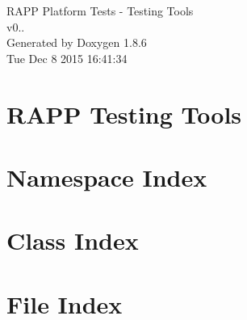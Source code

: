 \documentclass[twoside]{book}
\newcommand{\clearemptydoublepage}{%
  \newpage{\pagestyle{empty}\cleardoublepage}%
}
\begin{document}
\hypersetup{pageanchor=false}
\begin{titlepage}
\vspace*{7cm}
\begin{center}%
{\Large R\-A\-P\-P Platform Tests -\/ Testing Tools \\[1ex]\large v0.. }\\
\vspace*{1cm}
{\large Generated by Doxygen 1.8.6}\\
\vspace*{0.5cm}
{\small Tue Dec 8 2015 16:41:34}\\
\end{center}
\end{titlepage}
\clearemptydoublepage
\tableofcontents
\clearemptydoublepage
{}
\hypersetup{pageanchor=true}

\chapter{R\-A\-P\-P Testing Tools}
\label{md__home_travis_rapp_temp_rapp-platform_rapp_testing_tools_README}
\hypertarget{md__home_travis_rapp_temp_rapp-platform_rapp_testing_tools_README}{}

\chapter{Namespace Index}

\chapter{Class Index}

\chapter{File Index}

\end{document}
